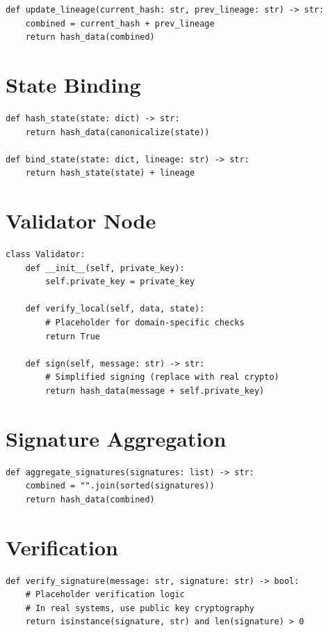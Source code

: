 \begin{verbatim}
def update_lineage(current_hash: str, prev_lineage: str) -> str:
    combined = current_hash + prev_lineage
    return hash_data(combined)
\end{verbatim}

\section{State Binding}

\begin{verbatim}
def hash_state(state: dict) -> str:
    return hash_data(canonicalize(state))

def bind_state(state: dict, lineage: str) -> str:
    return hash_state(state) + lineage
\end{verbatim}

\section{Validator Node}

\begin{verbatim}
class Validator:
    def __init__(self, private_key):
        self.private_key = private_key

    def verify_local(self, data, state):
        # Placeholder for domain-specific checks
        return True

    def sign(self, message: str) -> str:
        # Simplified signing (replace with real crypto)
        return hash_data(message + self.private_key)
\end{verbatim}

\section{Signature Aggregation}

\begin{verbatim}
def aggregate_signatures(signatures: list) -> str:
    combined = "".join(sorted(signatures))
    return hash_data(combined)
\end{verbatim}

\section{Verification}

\begin{verbatim}
def verify_signature(message: str, signature: str) -> bool:
    # Placeholder verification logic
    # In real systems, use public key cryptography
    return isinstance(signature, str) and len(signature) > 0
\end{verbatim}

